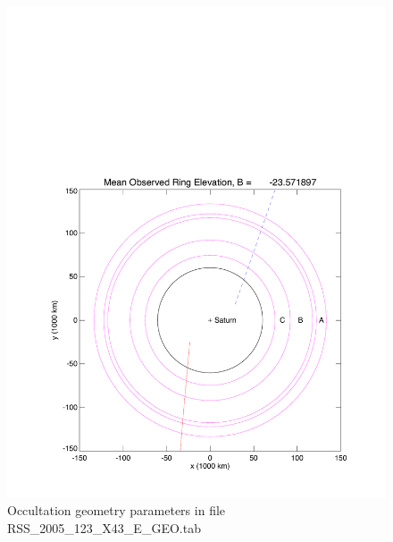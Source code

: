 \documentclass[crop=false,class=book]{standalone}
\begin{document}
\begin{figure}[H]
    \centering
    \includegraphics[page=2,trim = {0.8in 0.5in 0.21in 0.45in},clip,width=\textwidth]{Rev007_E_X43_summary_p1_08FEB2018.pdf}
    \caption{Occultation geometry parameters in file RSS\_2005\_123\_X43\_E\_GEO.tab}
\end{figure}
\end{document}
